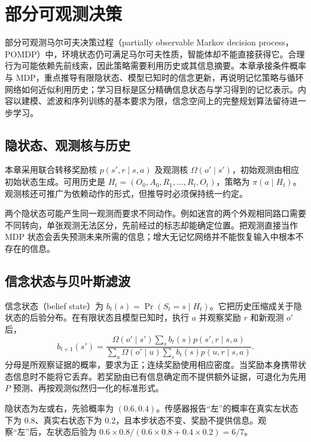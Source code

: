 \setcounter{chapter}{19} %
\chapter{部分可观测决策}
\label{ch:rl-pomdp}

部分可观测马尔可夫决策过程（partially observable Markov decision process，POMDP）中，环境状态仍可满足马尔可夫性质，智能体却不能直接获得它。合理行为可能依赖先前线索，因此策略需要利用历史或其信息摘要。本章承接条件概率与 MDP，重点推导有限隐状态、模型已知时的信念更新，再说明记忆策略与循环网络如何近似利用历史；学习目标是区分精确信息状态与学习得到的记忆表示。内容以建模、滤波和序列训练的基本要求为限，信念空间上的完整规划算法留待进一步学习。

\section{隐状态、观测核与历史}

本章采用联合转移奖励核 $p(s',r\mid s,a)$ 及观测核 $\Omega(o'\mid s')$，初始观测由相应初始状态生成。可用历史是 $H_t=(O_0,A_0,R_1,\ldots,R_t,O_t)$，策略为 $\pi(a\mid H_t)$。观测核还可推广为依赖动作的形式，但推导时必须保持统一约定。

两个隐状态可能产生同一观测而要求不同动作。例如迷宫的两个外观相同路口需要不同转向，单张观测无法区分，先前经过的标志却能确定位置。把观测直接当作 MDP 状态会丢失预测未来所需的信息；增大无记忆网络并不能恢复输入中根本不存在的信息。

\section{信念状态与贝叶斯滤波}

信念状态（belief state）为 $b_t(s)=\Pr(S_t=s\mid H_t)$。它把历史压缩成关于隐状态的后验分布。在有限状态且模型已知时，执行 $a$ 并观察奖励 $r$ 和新观测 $o'$ 后，
\begin{equation}
b_{t+1}(s')=
\frac{\Omega(o'\mid s')\sum_s b_t(s)p(s',r\mid s,a)}
{\sum_u\Omega(o'\mid u)\sum_s b_t(s)p(u,r\mid s,a)}.
\label{eq:rl-belief-update}
\end{equation}
分母是所观察证据的概率，要求为正；连续奖励使用相应密度。当奖励本身携带状态信息时不能将它丢弃。若奖励由已有信息确定而不提供额外证据，可退化为先用 $P$ 预测、再按观测似然归一化的标准形式。

\begin{example}[一次有噪观测]
隐状态为左或右，先验概率为 $(0.6,0.4)$。传感器报告“左”的概率在真实左状态下为 $0.8$、真实右状态下为 $0.2$，且本步状态不变、奖励不提供信息。观察“左”后，左状态后验为 $0.6\times0.8/(0.6\times0.8+0.4\times0.2)=6/7$。
\end{example}


